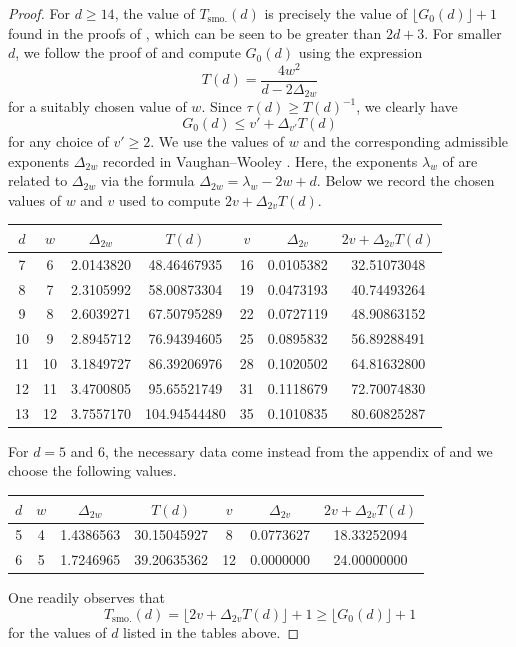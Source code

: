 \documentclass[reqno, 12pt, reqno]{amsart}
\numberwithin{equation}{section}
\renewcommand{\leq}{\leqslant}
\renewcommand{\geq}{\geqslant}
\renewcommand{\=}{\equiv}
\begin{document}
\begin{proof}
For $d \geq 14$, the value of $T_{\text{smo.}}(d)$ is precisely the value of $\lfloor G_0(d) \rfloor + 1$ found in the proofs of \cite[Thm 1.1 and Thm 1.3]{BruWoo}, which
can be seen to be greater than $2d + 3$. For smaller $d$, we follow the proof of \cite[Theorem 8.1]{BruWoo} and compute $G_0(d)$ using the expression
$$
T(d) =  \frac{4 w^2}{d - 2 \Delta_{2w}}
$$
for a suitably chosen value of $w$. Since $\tau(d) \geq T(d)^{-1}$, we clearly have
$$
G_0(d) \leq v' + \Delta_{v'} T(d)
$$
for any choice of $v' \geq 2$.
We use the values of $w$ and the corresponding admissible exponents
$\Delta_{2w}$ recorded in Vaughan--Wooley \cite[$\S$9--15]{FurtherImprovements4}. Here, the exponents
$\lambda_w$ of \cite{FurtherImprovements4} are related to $\Delta_{2w}$ via the formula
$\Delta_{2w} = \lambda_w - 2w + d$.
Below we record the chosen values of $w$ and $v$ used to compute $2v + \Delta_{2v} T(d)$.

\begin{center}
\begin{tabular}{|c|c|c|c|c|c|c|}
\hline
$d$ & $w$ & $\Delta_{2w}$ & $T(d)$ & $v$ & $\Delta_{2v}$ & $ 2v + \Delta_{2v} T(d) $ \\
\hline
7 & 6 &  2.0143820 & 48.46467935 & 16 & 0.0105382 & 32.51073048 \\
8 & 7 &  2.3105992 & 58.00873304 & 19 & 0.0473193 & 40.74493264 \\
9 & 8 &  2.6039271 & 67.50795289 & 22 & 0.0727119 & 48.90863152 \\
10 & 9 & 2.8945712 & 76.94394605 & 25 & 0.0895832 & 56.89288491 \\
11& 10 & 3.1849727 & 86.39206976 & 28 & 0.1020502 & 64.81632800 \\
12 & 11& 3.4700805 & 95.65521749 & 31 & 0.1118679 & 72.70074830 \\
13 & 12 &3.7557170 &104.94544480 & 35 & 0.1010835 & 80.60825287 \\
\hline
\end{tabular}
\end{center}
For $d=5$ and $6$, the necessary data come instead from the appendix of \cite{FurtherImprovements} and we choose the following values.
\begin{center}
\begin{tabular}{|c|c|c|c|c|c|c|}
\hline
$d$ & $w$ & $\Delta_{2w}$ & $T(d)$ & $v$ & $\Delta_{2v}$ & $ 2v + \Delta_{2v} T(d) $ \\
\hline
5 & 4 & 1.4386563 & 30.15045927  &  8 & 0.0773627 & 18.33252094  \\
6 & 5 & 1.7246965 & 39.20635362  & 12 & 0.0000000 & 24.00000000  \\
\hline
\end{tabular}
\end{center}
One readily observes that
$$
T_{\text{smo.}}(d) = \lfloor 2v + \Delta_{2v} T(d) \rfloor + 1 \geq  \lfloor G_0(d) \rfloor + 1
$$
for the values of $d$ listed in the tables above.
\end{proof}
\end{document}
